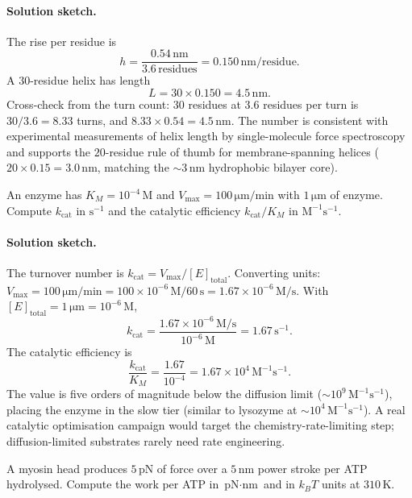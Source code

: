 \paragraph{Solution sketch.}
The rise per residue is
\[
h = \frac{0.54\,\text{nm}}{3.6\,\text{residues}} = 0.150\,\text{nm/residue}.
\]
A $30$-residue helix has length
\[
L = 30 \times 0.150 = 4.5\,\text{nm}.
\]
Cross-check from the turn count: $30$ residues at $3.6$ residues per
turn is $30/3.6 = 8.33$ turns, and $8.33 \times 0.54 = 4.5\,\text{nm}$.
The number is consistent with experimental measurements of helix
length by single-molecule force spectroscopy and supports the
$20$-residue rule of thumb for membrane-spanning helices
($20 \times 0.15 = 3.0\,\text{nm}$, matching the $\sim 3\,\text{nm}$
hydrophobic bilayer core).

\begin{exercise}
An enzyme has $K_M = 10^{-4}\,\text{M}$ and
$V_{\max} = 100\,\si{\micro\meter}/\text{min}$ with $1\,\si{\micro\meter}$
of enzyme. Compute $k_{\text{cat}}$ in $\text{s}^{-1}$ and the
catalytic efficiency $k_{\text{cat}}/K_M$ in $\text{M}^{-1}\text{s}^{-1}$.
\end{exercise}

\paragraph{Solution sketch.}
The turnover number is $k_{\text{cat}} = V_{\max}/[E]_{\text{total}}$.
Converting units: $V_{\max} = 100\,\si{\micro\meter}/\text{min} =
100 \times 10^{-6}\,\text{M} / 60\,\text{s} = 1.67 \times 10^{-6}\,\text{M}/\text{s}$.
With $[E]_{\text{total}} = 1\,\si{\micro\meter} = 10^{-6}\,\text{M}$,
\[
k_{\text{cat}} = \frac{1.67 \times 10^{-6}\,\text{M}/\text{s}}{10^{-6}\,\text{M}}
= 1.67\,\text{s}^{-1}.
\]
The catalytic efficiency is
\[
\frac{k_{\text{cat}}}{K_M} = \frac{1.67}{10^{-4}}
= 1.67 \times 10^{4}\,\text{M}^{-1}\text{s}^{-1}.
\]
The value is five orders of magnitude below the diffusion limit
($\sim 10^{9}\,\text{M}^{-1}\text{s}^{-1}$), placing the enzyme in
the slow tier (similar to lysozyme at
$\sim 10^{4}\,\text{M}^{-1}\text{s}^{-1}$). A real catalytic
optimisation campaign would target the chemistry-rate-limiting step;
diffusion-limited substrates rarely need rate engineering.

\begin{exercise}
A myosin head produces $5\,\text{pN}$ of force over a $5\,\text{nm}$
power stroke per ATP hydrolysed. Compute the work per ATP in
$\text{pN}\cdot\text{nm}$ and in $k_B T$ units at
$310\,\si{\kelvin}$.
\end{exercise}

